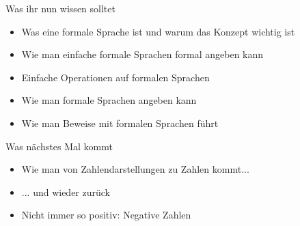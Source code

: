 \begin{frame}	
	\begin{block}{Was ihr nun wissen solltet}
		\begin{itemize}
			\item Was eine formale Sprache ist und warum das Konzept wichtig ist
			\item Wie man einfache formale Sprachen formal angeben kann
			\item Einfache Operationen auf formalen Sprachen
			\item Wie man formale Sprachen angeben kann
			\item Wie man Beweise mit formalen Sprachen führt
		\end{itemize}
	\end{block}
	
	\begin{block}{Was nächstes Mal kommt}
		\begin{itemize}
			\item Wie man von Zahlendarstellungen zu Zahlen kommt...
			\item[] ... und wieder zurück
			\item Nicht immer so positiv: Negative Zahlen
		\end{itemize}
	\end{block}
\end{frame}

\slideThanks


